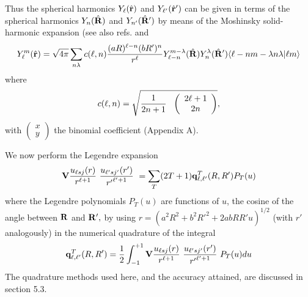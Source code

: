 \documentclass[11pt,a4paper]{article}
\newcommand{\vecr}{{\bf r}}
\newcommand{\vecR}{{\bf R}}
\newcommand{\half}{\frac{1}{2}}
\begin{document}
Thus the spherical harmonics
$ Y_\ell ( \hat \vecr ) $ and $ Y_{\ell'} ( \hat\vecr' ) $
can be given in terms of the spherical harmonics
$ Y_n ( \hat\vecR ) $ and $ Y_{n'} ( \hat\vecR' ) $
by means of the Moshinsky \cite{MOSH}
solid-harmonic expansion (see also refs. \cite{aust64}
and~\cite{OHMURA}
\begin{eqnarray}
Y_\ell^m ( \hat \vecr) =
   \sqrt {4 \pi} \sum_{n \lambda} c( \ell ,n)
   {(a R)^{\ell  - n} (b R' )^n  \over r^ \ell }
   Y_{\ell  - n}^{m - \lambda} ( \hat\vecR)
   Y_n^\lambda ( \hat\vecR')
  \langle \ell  - n m - \lambda n \lambda | \ell m\rangle
\end{eqnarray}
where
\begin{eqnarray} \nonumber
c( \ell ,n) = \sqrt { {1 \over 2n+1} ~~
                        \left ( \begin{array}{c}2 \ell + 1\\ 2n\end{array} \right ) } ,
\end{eqnarray}
with $\left ( \begin{array}{c}x\\y\end{array} \right )$  the binomial coefficient (Appendix A).


We now perform the Legendre expansion
\begin{eqnarray}
{\bf V} {u_{\ell sj} (r) \over r^{\ell +1}} ~
      {u_{\ell' sj'} (r') \over {r'}^{\ell' +1} }~
 =
  \sum _ T  (2T+1) {\bf q}^T_ {\ell , \ell'} (R,R')
                P_T (u)
\end{eqnarray}
where the Legendre polynomials $ P_T (u)$
are functions of $u$, the cosine of the angle between
$\vecR $ and $\vecR' ,$ by using
$r = (a^2 R^2 +b^2 {R'}^2 + 2abRR' u)^{1/2} $
(with $r'$ analogously) in the numerical quadrature of the integral
\begin{eqnarray} \label{genq}
 {\bf q}^T_ {\ell , \ell'} (R,R')
 =
   \half \int_ {-1} ^ {+1}
         {\bf V} {u_{\ell sj} (r)\over r^{\ell + 1}} ~
               {u_{\ell' sj'} (r')\over {r'}^{\ell' +1}} ~
              P_T (u) du
\end{eqnarray}
The quadrature methods used here, and the accuracy attained, are
discussed in section 5.3.
\end{document}
